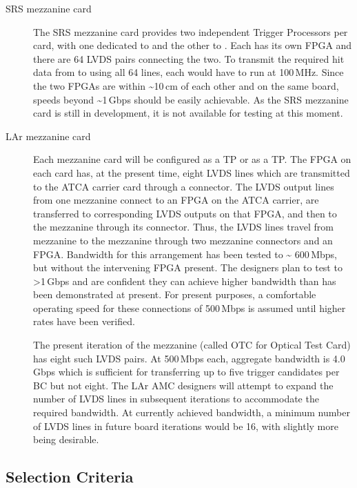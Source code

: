 \begin{description}
\item[SRS mezzanine card]
The SRS mezzanine card provides two independent Trigger Processors per card,
with one dedicated to \MM and the other to \stgc. Each has its own
FPGA and there are 64 LVDS pairs connecting the two. To transmit the
required hit data from \MM to \stgc using all 64 lines, each would have to
run at 100\,MHz. Since the two FPGAs are within \textasciitilde{}10\,cm of
each other and on the same board, speeds beyond \textasciitilde{}1\,Gbps
should be easily achievable. As the SRS mezzanine card is still in
development, it is not available for testing at this moment.

\item[LAr mezzanine card]
Each mezzanine card will be configured as a \MM TP or as a \stgc TP. The FPGA on
each card has, at the present time, eight LVDS lines which are transmitted
to the ATCA carrier card through a connector. The LVDS output lines from
one \MM mezzanine connect to an FPGA on the ATCA carrier, are transferred to
corresponding LVDS outputs on that FPGA, and then to the \stgc mezzanine
through its connector. Thus, the LVDS lines travel from \MM mezzanine to the
\stgc mezzanine through two mezzanine connectors and an FPGA. Bandwidth for this
arrangement has been tested to \textasciitilde{} 600\,Mbps, but without
the intervening FPGA present. The designers plan to test to
\textgreater{}1\,Gbps and are confident they can achieve higher bandwidth
than has been demonstrated at present. For present purposes, a
comfortable operating speed for these connections of 500\,Mbps is assumed
until higher rates have been verified.

The present iteration of the mezzanine (called OTC for Optical Test Card) has
eight such LVDS pairs. At 500\,Mbps each, aggregate bandwidth is 4.0\,Gbps
which is sufficient for transferring up to five trigger candidates per BC
but not eight. The LAr AMC designers will attempt to expand the number of
LVDS lines in subsequent iterations to accommodate the required
bandwidth. At currently achieved bandwidth, a minimum number of LVDS
lines in future board iterations would be 16, with slightly more being
desirable.
\end{description}


\subsection{Selection Criteria}\label{selection-criteria}

